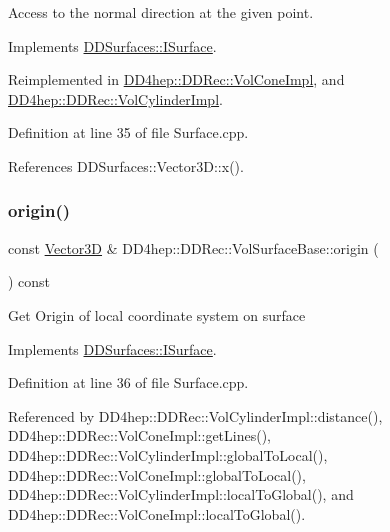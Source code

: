 Access to the normal direction at the given point. 



Implements \hyperlink{class_d_d_surfaces_1_1_i_surface_abbead4b1af2864d6d3f61270543310a0}{D\+D\+Surfaces\+::\+I\+Surface}.



Reimplemented in \hyperlink{class_d_d4hep_1_1_d_d_rec_1_1_vol_cone_impl_a0bdca94e1f57432f8b3d20c4cb1a3f7e}{D\+D4hep\+::\+D\+D\+Rec\+::\+Vol\+Cone\+Impl}, and \hyperlink{class_d_d4hep_1_1_d_d_rec_1_1_vol_cylinder_impl_a96815a3a2f7f759ffe5028384308a1aa}{D\+D4hep\+::\+D\+D\+Rec\+::\+Vol\+Cylinder\+Impl}.



Definition at line 35 of file Surface.\+cpp.



References D\+D\+Surfaces\+::\+Vector3\+D\+::x().

\hypertarget{class_d_d4hep_1_1_d_d_rec_1_1_vol_surface_base_a057675c3f4a66116703a467df8c348fe}{}\label{class_d_d4hep_1_1_d_d_rec_1_1_vol_surface_base_a057675c3f4a66116703a467df8c348fe} 
\subsubsection{\texorpdfstring{origin()}{origin()}}
{\footnotesize\ttfamily const \hyperlink{class_d_d_surfaces_1_1_vector3_d}{Vector3D} \& D\+D4hep\+::\+D\+D\+Rec\+::\+Vol\+Surface\+Base\+::origin (\begin{DoxyParamCaption}{ }\end{DoxyParamCaption}) const\hspace{0.3cm}{\ttfamily [virtual]}}

Get Origin of local coordinate system on surface 

Implements \hyperlink{class_d_d_surfaces_1_1_i_surface_a552cf76ca76154d0a6d9709d826b57f4}{D\+D\+Surfaces\+::\+I\+Surface}.



Definition at line 36 of file Surface.\+cpp.



Referenced by D\+D4hep\+::\+D\+D\+Rec\+::\+Vol\+Cylinder\+Impl\+::distance(), D\+D4hep\+::\+D\+D\+Rec\+::\+Vol\+Cone\+Impl\+::get\+Lines(), D\+D4hep\+::\+D\+D\+Rec\+::\+Vol\+Cylinder\+Impl\+::global\+To\+Local(), D\+D4hep\+::\+D\+D\+Rec\+::\+Vol\+Cone\+Impl\+::global\+To\+Local(), D\+D4hep\+::\+D\+D\+Rec\+::\+Vol\+Cylinder\+Impl\+::local\+To\+Global(), and D\+D4hep\+::\+D\+D\+Rec\+::\+Vol\+Cone\+Impl\+::local\+To\+Global().

